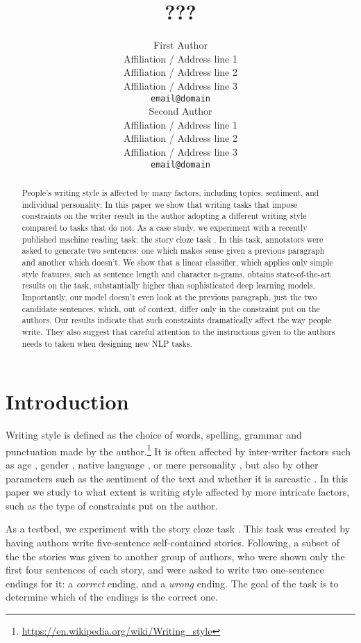 \documentclass[11pt,a4paper]{article}
\title{???}
\author{First Author \\
  Affiliation / Address line 1 \\
  Affiliation / Address line 2 \\
  Affiliation / Address line 3 \\
  {\tt email@domain} \\\And
  Second Author \\
  Affiliation / Address line 1 \\
  Affiliation / Address line 2 \\
  Affiliation / Address line 3 \\
  {\tt email@domain} \\}
\date{}
\begin{document}
\maketitle
\begin{abstract}
People's writing style is affected by many factors, including topics, sentiment, and individual personality. 
In this paper we show that writing tasks that impose constraints on the writer result in the author adopting a  different writing style compared to tasks that do not.
As a case study, we experiment with a recently published machine reading task: the story cloze task \cite{Mostafazadeh:2016}. 
In this task, annotators were asked to generate two sentences: one which makes sense given a previous paragraph and another which doesn't.
We show that a linear classifier, which applies only simple style features, such as sentence length and character n-grams, obtains state-of-the-art results on the task,
substantially higher than sophisticated deep learning models.
Importantly, our model doesn't even look at the previous paragraph, just the two candidate sentences, which, out of context, differ only in the constraint put on the authors. 
Our results indicate that such constraints dramatically affect the way people write. 
They also suggest that careful attention to the instructions given to the authors needs to taken when designing new NLP tasks.

  \end{abstract}
\section{Introduction}
Writing style is defined as the choice of words, spelling, grammar and punctuation made by the author.\footnote{\url{https://en.wikipedia.org/wiki/Writing_style}}
It is often affected by inter-writer factors such as age \cite{Schler:2006}, gender \cite{Argamon:2003}, native language \cite{Koppel:2005}, or mere personality \cite{Stamatatos:2009}, but also by other parameters such as the sentiment of the text \cite{Davidov:2010} and whether it is sarcastic \cite{Tsur:2010}.  
In this paper we study to what extent is writing style affected by more intricate factors, such as the type of constraints put on the author. 

As a testbed, we experiment with the story cloze task \cite{Mostafazadeh:2016}. 
This task was created by having authors write five-sentence self-contained stories.
Following, a subset of the the stories was given to another group of authors, who were shown only the first four sentences of each story, 
and were asked to write two one-sentence endings for it: a {\it correct} ending, and a {\it wrong} ending.
The goal of the task is to determine which of the endings is the correct one.
\end{document}
